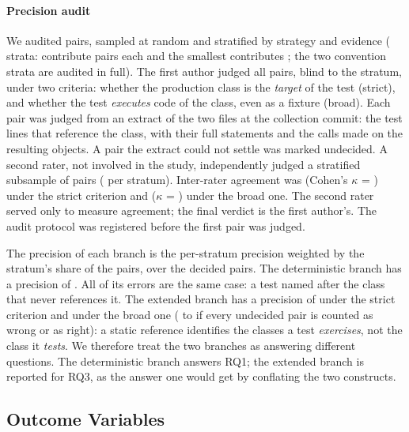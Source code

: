\paragraph{Precision audit} We audited \FparesAuditados{} pairs, sampled at random and
stratified by strategy and evidence (\FestratosAuditoria{} strata:
\FestratosCheiosAuditoria{} contribute \FparesPorEstratoAuditoria{} pairs each and the
smallest contributes \FparesMenorEstrato{}; the two convention strata are audited in full). The
first author judged all pairs, blind to the stratum, under two criteria: whether the
production class is the \emph{target} of the test (strict), and whether the test
\emph{executes} code of the class, even as a fixture (broad). Each pair was judged from an
extract of the two files at the collection commit: the test lines that reference the
class, with their full statements and the calls made on the resulting objects. A pair the
extract could not settle was marked undecided. A second rater, not involved in the study,
independently judged a stratified subsample of \FparesSegundoAvaliador{} pairs
(\FparesPorEstratoSegundo{} per stratum). Inter-rater agreement was
\FconcordanciaEstrito{} (Cohen's $\kappa$ = \FkappaEstrito{}) under the strict criterion
and \FconcordanciaAmplo{} ($\kappa$ = \FkappaAmplo{}) under the broad one. The second rater
served only to measure agreement; the final verdict is the first author's. The audit
protocol was registered before the first pair was judged.

The precision of each branch is the per-stratum precision weighted by the stratum's share
of the pairs, over the decided pairs. The deterministic branch has a precision of
\FprecisaoHumanaDet{}. All of its \FerrosHumanosDet{} errors are the same case: a test
named after the class that never references it. The extended branch has a precision of
\FprecisaoHumanaAmp{} under the strict criterion and \FprecisaoHumanaAmpAmplo{} under the
broad one (\FprecisaoHumanaAmpAmploInf{} to \FprecisaoHumanaAmpAmploSup{} if every
undecided pair is counted as wrong or as right): a static reference identifies the classes
a test \emph{exercises}, not the class it \emph{tests}. We therefore treat the two
branches as answering different questions. The deterministic branch answers RQ1; the
extended branch is reported for RQ3, as the answer one would get by conflating the two
constructs.

\subsection{Outcome Variables}
\label{sec:outcomes}

